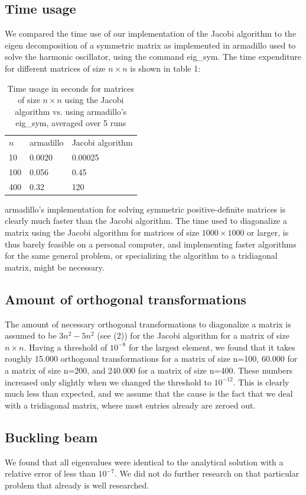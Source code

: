 \documentclass[10pt,a4paper]{article}
\begin{document}
\subsection{Time usage}
We compared the time use of our implementation of the Jacobi algorithm to the eigen decomposition of a symmetric matrix as implemented in armadillo used to solve the harmonic oscillator, using the command eig\_sym. The time expenditure for different matrices of size $n\times n$ is shown in table 1:
\begin{table}[H]
\caption[Comparison of time use for algorithms]{Time usage in seconds for matrices of size $n\times n$ using the Jacobi algorithm vs. using armadillo's eig\_sym, averaged over 5 runs}
\begin{tabular}{lll}
$n$ &  armadillo & Jacobi algorithm \\
 10 & 0.0020 & 0.00025 \\
 100 & 0.056 & 0.45\\
 400 & 0.32 & 120
\end{tabular}
\end{table}
armadillo's implementation for solving symmetric positive-definite matrices is clearly much faster than the Jacobi algorithm. The time used to diagonalize a matrix  using the Jacobi algorithm for matrices of size $1000\times 1000$ or larger, is thus barely feasible on a personal computer, and implementing faster algorithms for the same general problem, or specializing the algorithm to a tridiagonal matrix, might be necessary. 
\subsection{Amount of orthogonal transformations}
The amount of necessary orthogonal transformations to diagonalize a matrix is assumed to be $3n^2-5n^2$ (see (2)) for the Jacobi algorithm for a matrix of size $n\times n$. Having a threshold of $10^{-8}$ for the largest element, we found that it takes roughly 15.000 orthogonal transformations for a matrix of size n=100, 60.000 for a matrix of size n=200, and 240.000 for a matrix of size n=400. These numbers increased only slightly when we changed the threshold to $10^{-12}$. This is clearly much less than expected, and we assume that the cause is the fact that we deal with a tridiagonal matrix, where most entries already are zeroed out. 
\subsection{Buckling beam}
We found that all eigenvalues were identical to the analytical solution with a relative error of less than $10^{-7}$. We did not do further research on that particular problem that already is well researched.
\end{document}
